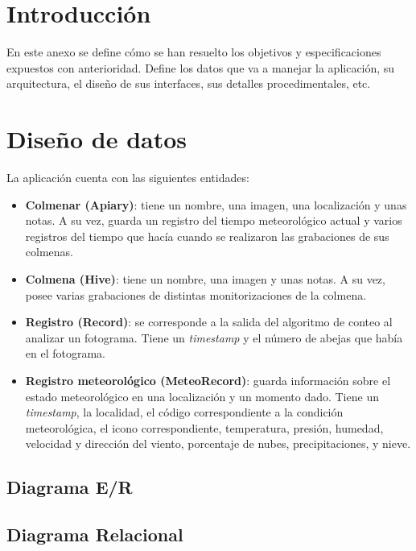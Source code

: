 
\section{Introducción}\label{introduccion}

En este anexo se define cómo se han resuelto los objetivos y
especificaciones expuestos con anterioridad. Define los datos que va a
manejar la aplicación, su arquitectura, el diseño de sus interfaces, sus
detalles procedimentales, etc.

\section{Diseño de datos}\label{diseno-de-datos}

La aplicación cuenta con las siguientes entidades:

\begin{itemize}
\tightlist
\item
  \textbf{Colmenar (Apiary)}: tiene un nombre, una imagen, una
  localización y unas notas. A su vez, guarda un registro del tiempo
  meteorológico actual y varios registros del tiempo que hacía cuando se
  realizaron las grabaciones de sus colmenas.
\item
  \textbf{Colmena (Hive)}: tiene un nombre, una imagen y unas notas. A
  su vez, posee varias grabaciones de distintas monitorizaciones de la
  colmena.
\item
  \textbf{Registro (Record)}: se corresponde a la salida del algoritmo
  de conteo al analizar un fotograma. Tiene un \emph{timestamp} y el
  número de abejas que había en el fotograma.
\item
  \textbf{Registro meteorológico (MeteoRecord)}: guarda información
  sobre el estado meteorológico en una localización y un momento dado.
  Tiene un \emph{timestamp}, la localidad, el código correspondiente a
  la condición meteorológica, el icono correspondiente, temperatura,
  presión, humedad, velocidad y dirección del viento, porcentaje de
  nubes, precipitaciones, y nieve.
\end{itemize}
\newpage
\subsection{Diagrama E/R}\label{diagrama-er}


\subsection{Diagrama Relacional}\label{diagrama-relacional}

